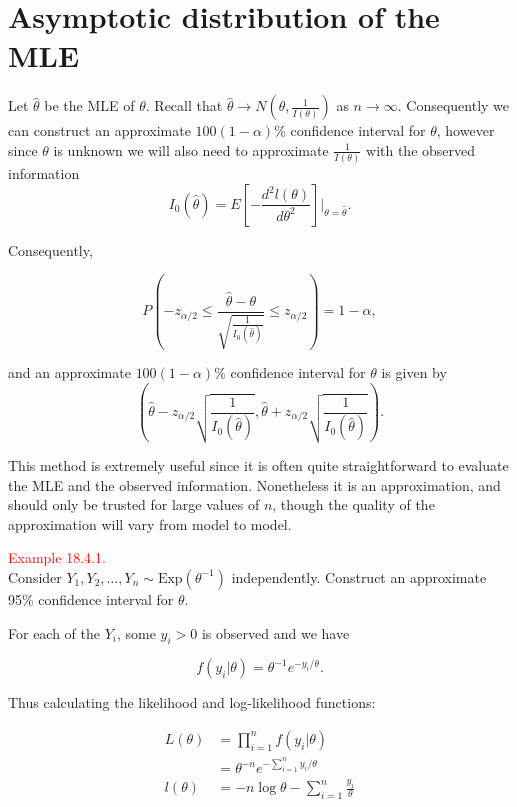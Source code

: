 \documentclass[
]{book}
\begin{document}
\hypertarget{Interval_Estimation:MLE}{%
\section{Asymptotic distribution of the MLE}\label{Interval_Estimation:MLE}}

Let \(\hat{\theta}\) be the MLE of \(\theta\). Recall that \(\hat{\theta} \rightarrow N \left( \theta, \frac{1}{I(\theta)} \right)\) as \(n \rightarrow \infty\). Consequently we can construct an approximate \(100(1-\alpha)\%\) confidence interval for \(\theta\), however since \(\theta\) is unknown we will also need to approximate \(\frac{1}{I(\theta)}\) with the observed information \[I_0(\hat{\theta}) = E \left[ - \frac{d^2 l(\theta)}{d \theta^2}\right] \Bigg|_{\theta = \hat{\theta}}.\]

Consequently,

\[ P\left(-z_{\alpha/2} \leq \frac{\hat{\theta}-\theta}{ \sqrt{ \frac{1}{I_0(\hat{\theta})} }} \leq z_{\alpha/2} \right) = 1-\alpha ,\]

and an approximate \(100(1-\alpha)\%\) confidence interval for \(\theta\) is given by\\

\[ \left( \hat{\theta} - z_{\alpha/2} \sqrt{ \frac{1}{I_0(\hat{\theta})} }, \hat{\theta} + z_{\alpha/2} \sqrt{ \frac{1}{I_0(\hat{\theta})} } \right).\]

This method is extremely useful since it is often quite straightforward to evaluate the MLE and the observed information. Nonetheless it is an approximation, and should only be trusted for large values of \(n\), though the quality of the approximation will vary from model to model.

\leavevmode{}%
\textcolor{red}{Example 18.4.1.}\\
Consider \(Y_1,Y_2,\dots,Y_n \sim \text{Exp}(\theta^{-1})\) independently. Construct an approximate 95\% confidence interval for \(\theta\).

For each of the \(Y_i\), some \(y_i>0\) is observed and we have

\[ f(y_i|\theta) = \theta^{-1} e^{-y_i/\theta}. \]

Thus calculating the likelihood and log-likelihood functions:

\begin{align*}
L(\theta) &= \prod\limits_{i=1}^n f(y_i | \theta)  \\
&= \theta^{-n} e^{-\sum\limits_{i=1}^n y_i/\theta} \\
l(\theta) &= -n\log\theta - \sum\limits_{i=1}^n \frac{y_i}{\theta}
\end{align*}
\end{document}
